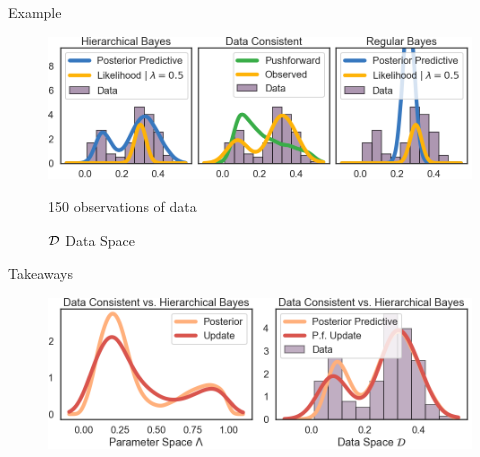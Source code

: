 \begin{block}{Example}
\begin{figure}
        \includegraphics[width=32cm]{figures/distr_EX_data_space.png}
        \vspace{-0.5cm}
        \centering
        \caption{150 observations of data}
        \vspace{-0.5cm}
        \caption{\large $\mathcal{D}$ Data Space  }
\end{figure}


\end{block}


\vspace{-0.75cm}


\begin{block}{Takeaways}

\centering
\vspace{-0.5cm}
\begin{figure}
        \includegraphics[width=30cm]{figures/distr_EX_comparison.png}
        \vspace{-0.5cm} 
        \caption{ }
    \end{figure}
\end{block}
